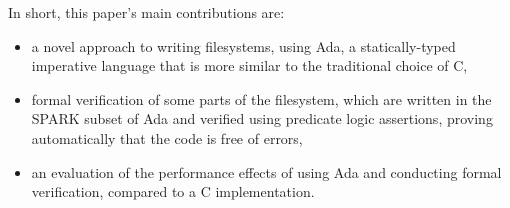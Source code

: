 In short, this paper's main contributions are:

\begin{itemize}
  \item a novel approach to writing filesystems, using Ada, a statically-typed imperative language that is more similar to the traditional choice of C,
  \item formal verification of some parts of the filesystem, which are written in the SPARK subset of Ada and verified using predicate logic assertions, proving automatically that the code is free of errors,
  \item an evaluation of the performance effects of using Ada and conducting formal verification, compared to a C implementation.
\end{itemize}
